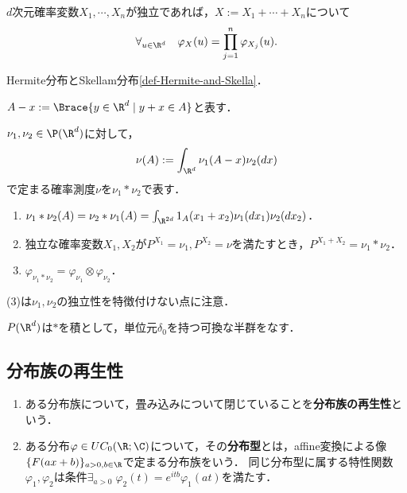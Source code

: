 \documentclass[uplatex,dvipdfmx]{jsreport}
\begin{document}
\begin{corollary}
    $d$次元確率変数$X_1,\cdots,X_n$が独立であれば，$X:=X_1+\cdots+X_n$について
    \[\forall_{u\in\R^d}\quad\varphi_X(u)=\prod^n_{j=1}\varphi_{X_j}(u).\]
\end{corollary}

\begin{example}
    Hermite分布とSkellam分布\ref{def-Hermite-and-Skella}．
\end{example}

\begin{notation}
    $A-x:=\Brace{y\in\R^d\mid y+x\in A}$と表す．
\end{notation}

\begin{definition}[convolution]
    $\nu_1,\nu_2\in\P(\R^d)$に対して，
    \[\nu(A):=\int_{\R^d}\nu_1(A-x)\nu_2(dx)\]
    で定まる確率測度$\nu$を$\nu_1*\nu_2$で表す．
\end{definition}

\begin{lemma}\mbox{}
    \begin{enumerate}
        \item $\nu_1*\nu_2(A)=\nu_2*\nu_1(A)=\int_{\R^{2d}}1_A(x_1+x_2)\nu_1(dx_1)\nu_2(dx_2)$．
        \item 独立な確率変数$X_1,X_2$が$P^{X_1}=\nu_1,P^{X_2}=\nu$を満たすとき，$P^{X_1+X_2}=\nu_1*\nu_2$．
        \item $\varphi_{\nu_1*\nu_2}=\varphi_{\nu_1}\otimes\varphi_{\nu_2}$．
    \end{enumerate}
    (3)は$\nu_1,\nu_2$の独立性を特徴付けない点に注意．
\end{lemma}

\begin{lemma}\label{lemma-semigroup-of-distributions}
    $P(\R^d)$は$*$を積として，単位元$\delta_0$を持つ可換な半群をなす．
\end{lemma}

\subsection{分布族の再生性}

\begin{definition}\mbox{}
    \begin{enumerate}
        \item ある分布族について，畳み込みについて閉じていることを\textbf{分布族の再生性}という．
        \item ある分布$\varphi\in UC_0(\R;\C)$について，その\textbf{分布型}とは，affine変換による像$\{F(ax+b)\}_{a>0,b\in\R}$で定まる分布族をいう．
        同じ分布型に属する特性関数$\varphi_1,\varphi_2$は条件$\exists_{a>0}\;\varphi_2(t)=e^{itb}\varphi_1(at)$を満たす．
    \end{enumerate}
\end{definition}
\end{document}
